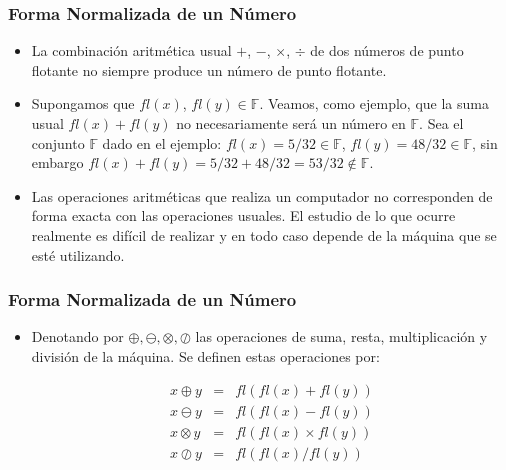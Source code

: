 \documentclass{beamer}
\begin{document}
\begin{frame}
  \frametitle{Forma Normalizada de un N\'umero}
  \begin{itemize}
   \item<1-> La combinaci\'on aritm\'etica usual $+$, $-$, $\times$, $\div$ de dos n\'umeros de punto flotante no siempre produce un n\'umero de punto flotante. 
   \item <2-> Supongamos que $fl(x)$, $fl(y) \in \mathbb{F}$. Veamos, como ejemplo, que la suma usual
   $fl(x)+fl(y)$ no necesariamente ser\'a un n\'umero en $\mathbb{F}$. Sea el conjunto $\mathbb{F}$ dado en el ejemplo: $fl(x) =5/32 \in \mathbb{F}$, $fl(y) =48/32 \in \mathbb{F}$, sin embargo $fl(x)+fl(y) =
   5/32 + 48/32 = 53/32 \notin \mathbb{F}$.
   \item Las operaciones aritm\'eticas que realiza un computador no corresponden de forma exacta con las operaciones usuales. El estudio de lo que ocurre realmente es dif\'icil de realizar y en todo caso depende de la m\'aquina que se est\'e
   utilizando.
  \end{itemize}
\end{frame}
\begin{frame}
   \frametitle{Forma Normalizada de un N\'umero}
   \begin{itemize}   
   \item Denotando por $\oplus,\ominus,\otimes,\oslash$ las operaciones de suma, resta, multiplicaci\'on y divisi\'on de la m\'aquina. Se definen estas operaciones por:
   \begin{block}{} 
   $$
   \begin{array}{lll}
    x \oplus y & = & fl(fl(x) + fl(y))\\
    x \ominus y & = & fl(fl(x) - fl(y))\\
    x \otimes y & = & fl(fl(x) \times fl(y))\\
    x \oslash y & = & fl(fl(x) / fl(y))\\
   \end{array}
   $$
   \end{block}
   \end{itemize}
\end{frame}
  


   
\end{document}
